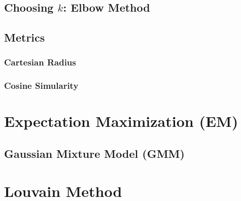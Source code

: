 \subsection{Choosing \texorpdfstring{$k$}{k}: Elbow Method}
\label{cluster:kMean:elbow}

\subsection{Metrics}
\label{cluster:kMean:metrics}

\subsubsection{Cartesian Radius}
\label{cluster:kMean:metrics:cartesian}


\subsubsection{Cosine Simularity}
\label{cluster:kMean:metrics:cos}


\section{Expectation Maximization (EM)}
\label{cluster:EM}

\subsection{Gaussian Mixture Model (GMM)}
\label{cluster:EM:GMM}

\section{Louvain Method}
\label{cluster:louvain}


